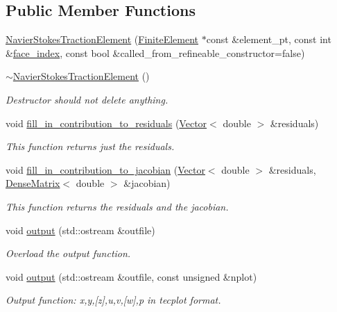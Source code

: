 \subsection*{Public Member Functions}
\begin{DoxyCompactItemize}
\item 
\hyperlink{classoomph_1_1NavierStokesTractionElement_af7905c7123e02a63ed41b4c7c2ad468d}{Navier\+Stokes\+Traction\+Element} (\hyperlink{classoomph_1_1FiniteElement}{Finite\+Element} $\ast$const \&element\+\_\+pt, const int \&\hyperlink{classoomph_1_1FaceElement_a478d577ac6db67ecc80f1f02ae3ab170}{face\+\_\+index}, const bool \&called\+\_\+from\+\_\+refineable\+\_\+constructor=false)
\item 
\hyperlink{classoomph_1_1NavierStokesTractionElement_ab45fafc53fd532054e11cc2f2e68659c}{$\sim$\+Navier\+Stokes\+Traction\+Element} ()
\begin{DoxyCompactList}\small\item\em Destructor should not delete anything. \end{DoxyCompactList}\item 
void \hyperlink{classoomph_1_1NavierStokesTractionElement_a049940e46f7aba913cf05f95c31061f3}{fill\+\_\+in\+\_\+contribution\+\_\+to\+\_\+residuals} (\hyperlink{classoomph_1_1Vector}{Vector}$<$ double $>$ \&residuals)
\begin{DoxyCompactList}\small\item\em This function returns just the residuals. \end{DoxyCompactList}\item 
void \hyperlink{classoomph_1_1NavierStokesTractionElement_a87adb28c2292e58aab9ff1d1ebbd3fc7}{fill\+\_\+in\+\_\+contribution\+\_\+to\+\_\+jacobian} (\hyperlink{classoomph_1_1Vector}{Vector}$<$ double $>$ \&residuals, \hyperlink{classoomph_1_1DenseMatrix}{Dense\+Matrix}$<$ double $>$ \&jacobian)
\begin{DoxyCompactList}\small\item\em This function returns the residuals and the jacobian. \end{DoxyCompactList}\item 
void \hyperlink{classoomph_1_1NavierStokesTractionElement_a0bbcf5b0d476a337fcfa878d2b8b3079}{output} (std\+::ostream \&outfile)
\begin{DoxyCompactList}\small\item\em Overload the output function. \end{DoxyCompactList}\item 
void \hyperlink{classoomph_1_1NavierStokesTractionElement_aa086549476addc474e49f5f225fb5059}{output} (std\+::ostream \&outfile, const unsigned \&nplot)
\begin{DoxyCompactList}\small\item\em Output function\+: x,y,\mbox{[}z\mbox{]},u,v,\mbox{[}w\mbox{]},p in tecplot format. \end{DoxyCompactList}\end{DoxyCompactItemize}
